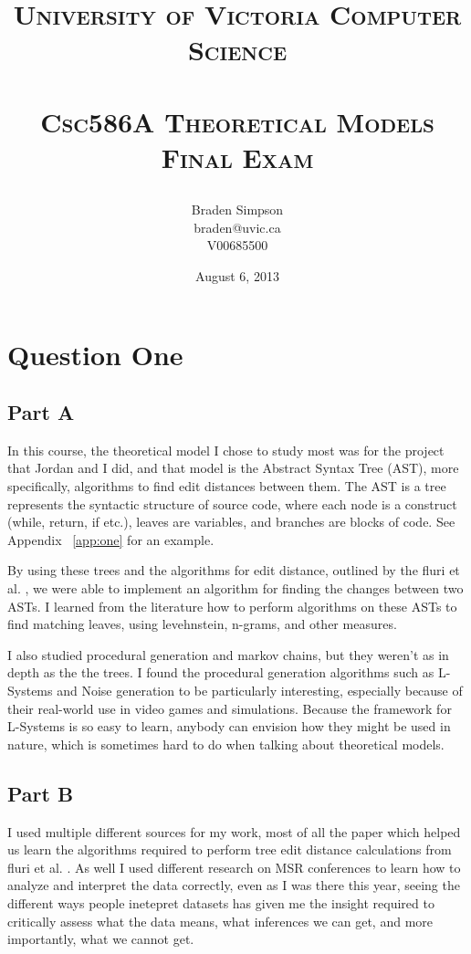 \documentclass{article}
\title{
\large{\textsc{University of Victoria Computer Science}}\huge\\ [0pt] %
\horrule{0.5pt}\\[0.4cm]
\textsc{Csc586A Theoretical Models\\Final Exam}\\
\author{Braden Simpson\\braden@uvic.ca\\V00685500}
\date{August 6, 2013}
}
\numberwithin{equation}{section} %
\numberwithin{figure}{section} %
\numberwithin{table}{section} %
\begin{document}
\maketitle %

\section{Question One}
\label{sec:one}
\subsection{Part A}
In this course, the theoretical model I chose to study most was for the project that Jordan and I did, and that model is the Abstract Syntax Tree (AST), more specifically, algorithms to find edit distances between them.  The AST is a tree represents the syntactic structure of source code, where each node is a construct (while, return, if etc.), leaves are variables, and branches are blocks of code.  See Appendix ~\ref{app:one} for an example.

By using these trees and the algorithms for edit distance, outlined by the fluri et al. \cite{fluri}, we were able to implement an algorithm for finding the changes between two ASTs.  I learned from the literature how to perform algorithms on these ASTs to find matching leaves, using levehnstein, n-grams, and other measures.

I also studied procedural generation and markov chains, but they weren't as in depth as the the trees.  I found the procedural generation algorithms such as L-Systems and Noise generation to be particularly interesting, especially because of their real-world use in video games and simulations.  Because the framework for L-Systems is so easy to learn, anybody can envision how they might be used in nature, which is sometimes hard to do when talking about theoretical models.

\subsection{Part B}
I used multiple different sources for my work, most of all the paper which helped us learn the algorithms required to perform tree edit distance calculations from fluri et al. \cite{fluri}.  As well I used different research on MSR conferences to learn how to analyze and interpret the data correctly, even as I was there this year, seeing the different ways people inetepret datasets has given me the insight required to critically assess what the data means, what inferences we can get, and more importantly, what we cannot get.  
\end{document}
